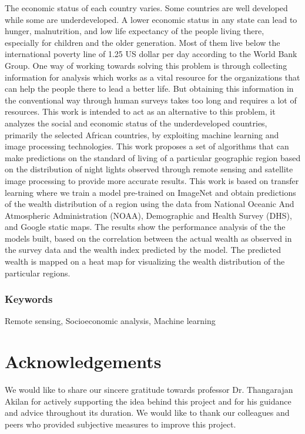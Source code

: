 \vspace{0.5cm}
The economic status of each country varies. Some countries are well developed while some are underdeveloped. A lower economic status in any state can lead to hunger, malnutrition, and low life expectancy of the people living there, especially for children and the older generation. Most of them live below the international poverty line of 1.25 US dollar per day according to the World Bank Group. One way of working towards solving this problem is through collecting information for analysis which works as a vital resource for the organizations that can help the people there to lead a better life. But obtaining this information in the conventional way through human surveys takes too long and requires a lot of resources. This work is intended to act as an alternative to this problem, it analyzes the social and economic status of the underdeveloped countries, primarily the selected African countries, by exploiting machine learning and image processing technologies. This work proposes a set of algorithms that can make predictions on the standard of living of a particular geographic region based on the distribution of night lights observed through remote sensing and satellite image processing to provide more accurate results. This work is based on transfer learning where we train a model pre-trained on ImageNet and obtain predictions of the wealth distribution of a region using the data from National Oceanic And Atmospheric Administration (NOAA), Demographic and Health Survey (DHS), and Google static maps. The results show the performance analysis of the the models built, based on the correlation between the actual wealth as observed in the survey data and the wealth index predicted by the model. The predicted wealth is mapped on a heat map for visualizing the wealth distribution of the particular regions.




\subsection*{Keywords}
Remote sensing, Socioeconomic analysis, Machine learning







\newpage
\thispagestyle{plain}
\chapter*{Acknowledgements}
We would like to share  our sincere gratitude towards professor Dr. Thangarajan Akilan for actively supporting the idea behind this project and for his guidance and advice throughout its duration. We would like to thank our colleagues and peers who provided subjective measures to improve this project. 




